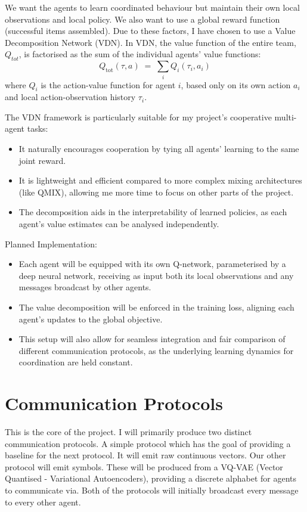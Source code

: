 We want the agents to learn coordinated behaviour but maintain their own local observations and local policy. We also want to use a global reward function (successful items assembled). Due to these factors, I have chosen to use a Value Decomposition Network (VDN).
In VDN, the value function of the entire team, $Q_{tot}$, is factorised as the sum of the individual agents' value functions:
\[
Q_{\mathrm{tot}}(\tau, a) \;=\; \sum_{i} Q_{i}(\tau_{i}, a_{i})
\]
where $Q_i$ is the action-value function for agent $i$, based only on its own action $a_i$ and local action-observation history $\tau_i$.

The VDN framework is particularly suitable for my project's cooperative multi-agent tasks:
\begin{itemize}
\item It naturally encourages cooperation by tying all agents' learning to the same joint reward.
\item It is lightweight and efficient compared to more complex mixing architectures (like QMIX), allowing me more time to focus on other parts of the project.
\item The decomposition aids in the interpretability of learned policies, as each agent's value estimates can be analysed independently.
\end{itemize}

Planned Implementation:
\begin{itemize}
\item Each agent will be equipped with its own Q-network, parameterised by a deep neural network, receiving as input both its local observations and any messages broadcast by other agents.
\item The value decomposition will be enforced in the training loss, aligning each agent's updates to the global objective.
\item This setup will also allow for seamless integration and fair comparison of different communication protocols, as the underlying learning dynamics for coordination are held constant.
\end{itemize}

\section*{Communication Protocols}
This is the core of the project. I will primarily produce two distinct communication protocols. A simple protocol which has the goal of providing a baseline for the next protocol. It will emit raw continuous vectors. Our other protocol will emit symbols. These will be produced from a VQ-VAE (Vector Quantised - Variational Autoencoders), providing a discrete alphabet for agents to communicate via. Both of the protocols will initially broadcast every message to every other agent.

